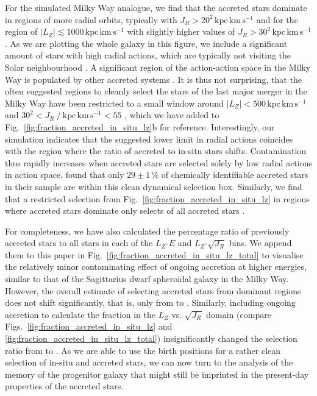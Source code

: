 \documentclass[fleqn,usenatbib]{mnras}
\begin{document}
For the simulated Milky Way analogue, we find that the accreted stars dominate in regions of more radial orbits, typically with $J_R > 20^2\,\mathrm{kpc\,km\,s^{-1}}$ and for the region of $\vert L_Z \vert \lesssim 1000\,\mathrm{kpc\,km\,s^{-1}}$ with slightly higher values of $J_R > 30^2\,\mathrm{kpc\,km\,s^{-1}}$ . As we are plotting the whole galaxy in this figure, we include a significant amount of stars with high radial actions, which are typically not visiting the Solar neighbourhood \citep[compare Figs.~\ref{fig:lz_e_jr}e and \ref{fig:lz_e_jr}f and see for example][]{Feuillet2019}. A significant region of the action-action space in the Milky Way is populated by other accreted systems \citep[for example][]{Myeong2019, Naidu2020}. It is thus not surprising, that the often suggested regions to cleanly select the stars of the last major merger in the Milky Way have been restricted to a small window around $\vert L_Z \vert < 500\,\mathrm{kpc\,km\,s^{-1}}$ and $30^2 < J_R~/~\mathrm{kpc\,km\,s^{-1}} < 55$ \citep{Feuillet2021, Buder2022}, which we have added to Fig.~\ref{fig:fraction_accreted_in_situ_lz}b for reference. Interestingly, our simulation indicates that the suggested lower limit in radial actions coincides with the region where the ratio of accreted to in-situ stars shifts. Contamination thus rapidly increases when accreted stars are selected solely by low radial actions in action space. \citet{Buder2022} found that only $29 \pm 1\,\mathrm{\%}$ of chemically identifiable accreted stars in their sample are within this clean dynamical selection box. Similarly, we find that a restricted selection from Fig.~\ref{fig:fraction_accreted_in_situ_lz} in regions where accreted stars dominate only selects  of all accreted stars \citep[for a study of other selection criteria and their purity as well as completeness see][]{Carrillo2024}.

For completeness, we have also calculated the percentage ratio of previously accreted stars to all stars in each of the $L_Z$-$E$ and $L_Z$-$\sqrt{J_R}$ bins. We append them to this paper in Fig.~\ref{fig:fraction_accreted_in_situ_lz_total} to visualise the relatively minor contaminating effect of ongoing accretion at higher energies, similar to that of the Sagittarius dwarf spheroidal galaxy in the Milky Way. However, the overall estimate of selecting accreted stars from dominant regions does not shift significantly, that is, only from  to . Similarly, including ongoing accretion to calculate the fraction in the $L_Z$ vs. $\sqrt{J_R}$ domain (compare Figs.~\ref{fig:fraction_accreted_in_situ_lz} and \ref{fig:fraction_accreted_in_situ_lz_total}) insignificantly changed the selection ratio from  to . As we are able to use the birth positions for a rather clean selection of in-situ and accreted stars, we can now turn to the analysis of the memory of the progenitor galaxy that might still be imprinted in the present-day properties of the accreted stars.
\end{document}
